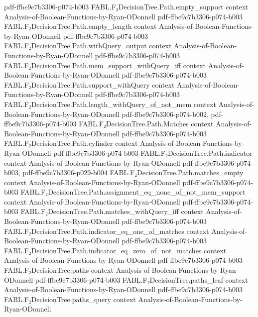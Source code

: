 \begin{theorem}
  {pdf-ffbe9c7b3306-p074-b003}
\proofstep
  {FABL.F₂DecisionTree.Path.empty_support}
  {context}
  {Analysis-of-Boolean-Functions-by-Ryan-ODonnell}
  {pdf-ffbe9c7b3306-p074-b003}
\proofstep
  {FABL.F₂DecisionTree.Path.empty_length}
  {context}
  {Analysis-of-Boolean-Functions-by-Ryan-ODonnell}
  {pdf-ffbe9c7b3306-p074-b003}
\proofstep
  {FABL.F₂DecisionTree.Path.withQuery_output}
  {context}
  {Analysis-of-Boolean-Functions-by-Ryan-ODonnell}
  {pdf-ffbe9c7b3306-p074-b003}
\proofstep
  {FABL.F₂DecisionTree.Path.mem_support_withQuery_iff}
  {context}
  {Analysis-of-Boolean-Functions-by-Ryan-ODonnell}
  {pdf-ffbe9c7b3306-p074-b003}
\proofstep
  {FABL.F₂DecisionTree.Path.support_withQuery}
  {context}
  {Analysis-of-Boolean-Functions-by-Ryan-ODonnell}
  {pdf-ffbe9c7b3306-p074-b003}
\proofstep
  {FABL.F₂DecisionTree.Path.length_withQuery_of_not_mem}
  {context}
  {Analysis-of-Boolean-Functions-by-Ryan-ODonnell}
  {pdf-ffbe9c7b3306-p074-b002,
    pdf-ffbe9c7b3306-p074-b003}
\proofstep
  {FABL.F₂DecisionTree.Path.Matches}
  {context}
  {Analysis-of-Boolean-Functions-by-Ryan-ODonnell}
  {pdf-ffbe9c7b3306-p074-b003}
\proofstep
  {FABL.F₂DecisionTree.Path.cylinder}
  {context}
  {Analysis-of-Boolean-Functions-by-Ryan-ODonnell}
  {pdf-ffbe9c7b3306-p074-b003}
\proofstep
  {FABL.F₂DecisionTree.Path.indicator}
  {context}
  {Analysis-of-Boolean-Functions-by-Ryan-ODonnell}
  {pdf-ffbe9c7b3306-p074-b003,
    pdf-ffbe9c7b3306-p029-b004}
\proofstep
  {FABL.F₂DecisionTree.Path.matches_empty}
  {context}
  {Analysis-of-Boolean-Functions-by-Ryan-ODonnell}
  {pdf-ffbe9c7b3306-p074-b003}
\proofstep
  {FABL.F₂DecisionTree.Path.assignment_eq_none_of_not_mem_support}
  {context}
  {Analysis-of-Boolean-Functions-by-Ryan-ODonnell}
  {pdf-ffbe9c7b3306-p074-b003}
\proofstep
  {FABL.F₂DecisionTree.Path.matches_withQuery_iff}
  {context}
  {Analysis-of-Boolean-Functions-by-Ryan-ODonnell}
  {pdf-ffbe9c7b3306-p074-b003}
\proofstep
  {FABL.F₂DecisionTree.Path.indicator_eq_one_of_matches}
  {context}
  {Analysis-of-Boolean-Functions-by-Ryan-ODonnell}
  {pdf-ffbe9c7b3306-p074-b003}
\proofstep
  {FABL.F₂DecisionTree.Path.indicator_eq_zero_of_not_matches}
  {context}
  {Analysis-of-Boolean-Functions-by-Ryan-ODonnell}
  {pdf-ffbe9c7b3306-p074-b003}
\proofstep
  {FABL.F₂DecisionTree.paths}
  {context}
  {Analysis-of-Boolean-Functions-by-Ryan-ODonnell}
  {pdf-ffbe9c7b3306-p074-b003}
\proofstep
  {FABL.F₂DecisionTree.paths_leaf}
  {context}
  {Analysis-of-Boolean-Functions-by-Ryan-ODonnell}
  {pdf-ffbe9c7b3306-p074-b003}
\proofstep
  {FABL.F₂DecisionTree.paths_query}
  {context}
  {Analysis-of-Boolean-Functions-by-Ryan-ODonnell}

\end{theorem}
